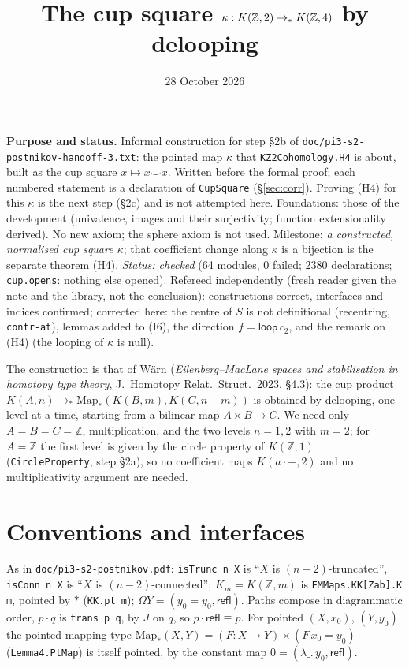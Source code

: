 \documentclass[11pt]{amsart}
\title{The cup square $\kappa:K(\Z,2)\to_*K(\Z,4)$ by delooping}
\date{28 October 2026}
\theoremstyle{definition}
\theoremstyle{remark}
\newcommand{\Om}{\Omega}
\newcommand{\Map}{\mathrm{Map}_*}
\newcommand{\Z}{\mathbb{Z}}
\newcommand{\code}[1]{\texttt{#1}}
\newcommand{\cc}{\cdot}
\newcommand{\refl}{\mathsf{refl}}
\newcommand{\lp}{\mathsf{loop}}
\begin{document}
\maketitle

\noindent\textbf{Purpose and status.} Informal construction for step
\S2b of \code{doc/pi3-s2-postnikov-handoff-3.txt}: the pointed map
$\kappa$ that \code{KZ2Cohomology.H4} is about, built as the cup square
$x\mapsto x\smile x$. Written before the formal proof; each numbered
statement is a declaration of \code{CupSquare}
(\S\ref{sec:corr}). Proving (H4) for this $\kappa$ is the next step (\S2c)
and is not attempted here. Foundations: those of the development
(univalence, images and their surjectivity; function extensionality
derived). No new axiom; the sphere axiom is not used.
Milestone: \emph{a constructed, normalised cup square $\kappa$}; that
coefficient change along $\kappa$ is a bijection is the separate theorem
(H4). \emph{Status: checked} (64 modules, 0 failed; 2380 declarations;
\code{cup.opens}: nothing else opened). Refereed independently (fresh reader given the note and
the library, not the conclusion): constructions correct, interfaces and
indices confirmed; corrected here: the centre of $S$ is not definitional
(recentring, \code{contr-at}), lemmas added to (I6), the direction
$f=\lp\,c_2$, and the remark on (H4) (the looping of $\kappa$ is null).

The construction is that of Wärn (\emph{Eilenberg--MacLane spaces and
stabilisation in homotopy type theory}, J.\ Homotopy Relat.\ Struct.\ 2023,
\S4.3): the cup product $K(A,n)\to_*\Map(K(B,m),K(C,n+m))$ is obtained by
delooping, one level at a time, starting from a bilinear map
$A\times B\to C$. We need only $A=B=C=\Z$, multiplication, and the two
levels $n=1,2$ with $m=2$; for $A=\Z$ the first level is given by the
circle property of $K(\Z,1)$ (\code{CircleProperty}, step \S2a), so no
coefficient maps $K(a\cdot{-},2)$ and no multiplicativity argument are
needed.

\section{Conventions and interfaces}

As in \code{doc/pi3-s2-postnikov.pdf}: \code{isTrunc n X} is ``$X$ is
$(n-2)$-truncated'', \code{isConn n X} is ``$X$ is $(n-2)$-connected'';
$K_m=K(\Z,m)$ is \code{EMMaps.KK[Zab].K m}, pointed by $*$
(\code{KK.pt m}); $\Om Y=(y_0=y_0,\refl)$. Paths compose in diagrammatic
order, $p\cc q$ is \code{trans p q}, by $J$ on $q$, so $p\cc\refl\equiv p$.
For pointed $(X,x_0)$, $(Y,y_0)$ the pointed mapping type
$\Map(X,Y)=(F:X\to Y)\times(F\,x_0=y_0)$ (\code{Lemma4.PtMap}) is itself
pointed, by the constant map $0=(\lambda\_.\,y_0,\refl)$.
\end{document}
